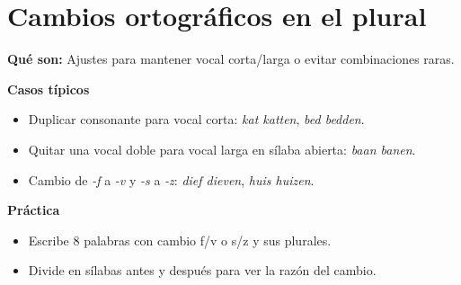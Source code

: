 \section{Cambios ortográficos en el plural}
\textbf{Qué son:} Ajustes para mantener vocal corta/larga o evitar combinaciones raras.

\textbf{Casos típicos}
\begin{itemize}[leftmargin=*]
  \item Duplicar consonante para vocal corta: \textit{kat \textrightarrow{} katten}, \textit{bed \textrightarrow{} bedden}.
  \item Quitar una vocal doble para vocal larga en sílaba abierta: \textit{baan \textrightarrow{} banen}.
  \item Cambio de \textit{-f} a \textit{-v} y \textit{-s} a \textit{-z}: \textit{dief \textrightarrow{} dieven}, \textit{huis \textrightarrow{} huizen}.
\end{itemize}

\textbf{Práctica}
\begin{itemize}[leftmargin=*]
  \item Escribe 8 palabras con cambio f/v o s/z y sus plurales.
  \item Divide en sílabas antes y después para ver la razón del cambio.
\end{itemize}
